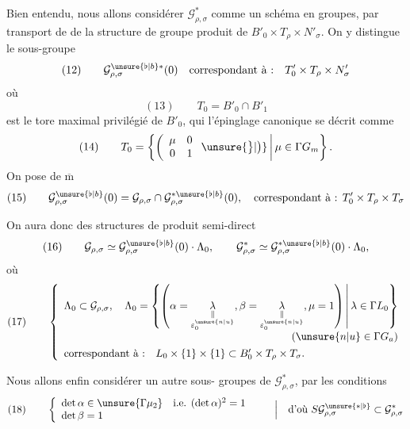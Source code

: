 Bien entendu, nous allons considérer $\mathcal G_{\rho,\sigma}^{*}$ comme un schéma en groupes,
par transport de  de la structure de groupe produit de
$B'_0\times T_\rho\times N'_\sigma$.
On y distingue le sous-groupe
\[
(12)\qquad \mathcal G_{\rho,\sigma}^{\unsure{\flat|b}*}(0)
\quad\text{correspondant à :}\quad T'_0\times T_\rho\times N'_\sigma
\]
où
\[
(13)\qquad T_0=B'_0\cap B'_1
\]
est le tore maximal privilégié de $B'_0$, qui
  l'épinglage canonique se décrit comme
\[
(14)\qquad T_0=\left\{\left(\begin{array}{cc}\mu&0\\0&1\end{array}\right.\unsure{\big\}|\big)}
\,\middle|\,\mu\in\Gamma\mathbb \mathbb G_m\right\}.
\]
On pose de $\overline{\mathrm m}$
\[
(15)\qquad \mathcal G_{\rho,\sigma}^{\unsure{\flat|b}}(0)
=\mathcal G_{\rho,\sigma}\cap\mathcal G_{\rho,\sigma}^{*\unsure{\flat|b}}(0),
\quad\text{correspondant à : }T'_0\times T_\rho\times T_\sigma
\]




On aura donc des structures de produit semi-direct
\[
(16)\qquad
\mathcal G_{\rho,\sigma}\simeq
\mathcal G_{\rho,\sigma}^{\unsure{\flat|b}}(0)\cdot\Lambda_0,
\qquad
\mathcal G_{\rho,\sigma}^{*}\simeq
\mathcal G_{\rho,\sigma}^{*\unsure{\flat|b}}(0)\cdot\Lambda_0,
\]
où
\[
(17)\qquad
\left\{\begin{array}{l}
\displaystyle\Lambda_0\subset\mathcal G_{\rho,\sigma},\quad
\Lambda_0=\left\{\left(
\alpha=\underset{\substack{\Vert\\\varepsilon_0^{\unsure{n|u}}}}{\lambda},
\beta=\underset{\substack{\Vert\\\varepsilon_0^{\unsure{n|u}}}}{\lambda},
\mu=1\right)\,\middle|\,\lambda\in\Gamma L_0\right\}\\
\hfill(\unsure{n|u}\in\Gamma\mathbb \mathbb G_a)\\[4pt]
\text{correspondant à :}\quad L_0\times\{1\}\times\{1\}
\subset B'_0\times T_\rho\times T_\sigma.
\end{array}\right.
\]

Nous allons enfin considérer un autre sous- groupes de
$\mathcal G_{\rho,\sigma}^{*}$, par les conditions
\[
(18)\qquad
\left\{\begin{array}{l}
\det\alpha\in\unsure{\Gamma\mu_2}\quad\text{i.e. }(\det\alpha)^2=1\\
\det\beta=1
\end{array}\right.
\qquad\left|\quad\text{d'où }S\mathcal G_{\rho,\sigma}^{\unsure{*|\flat}}
\subset\mathcal G_{\rho,\sigma}^{*}\right.
\]

